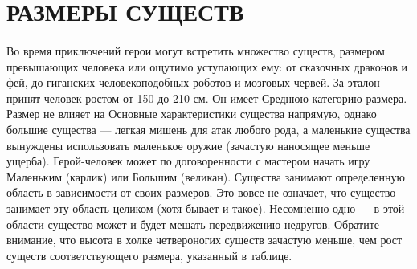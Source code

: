 \section{РАЗМЕРЫ СУЩЕСТВ}
\paragraph{}
Во время приключений герои могут встретить множество существ, размером превышающих человека или ощутимо уступающих ему: от сказочных драконов и фей, до гиганских человекоподобных роботов и мозговых червей. За эталон принят человек ростом от 150 до 210 см. Он имеет Среднюю категорию размера. Размер не влияет на Основные характеристики существа напрямую, однако большие существа — легкая мишень для атак любого рода, а маленькие существа вынуждены использовать маленькое оружие (зачастую наносящее меньше ущерба). Герой-человек может по договоренности с мастером начать игру Маленьким (карлик) или Большим (великан).
\newline
Существа занимают определенную область в зависимости от своих размеров. Это вовсе не означает, что существо занимает эту область целиком (хотя бывает и такое). Несомненно одно — в этой области существо может и будет мешать передвижению недругов. Обратите внимание, что высота в холке четвероногих существ зачастую меньше, чем рост существ соответствующего размера, указанный в таблице.
